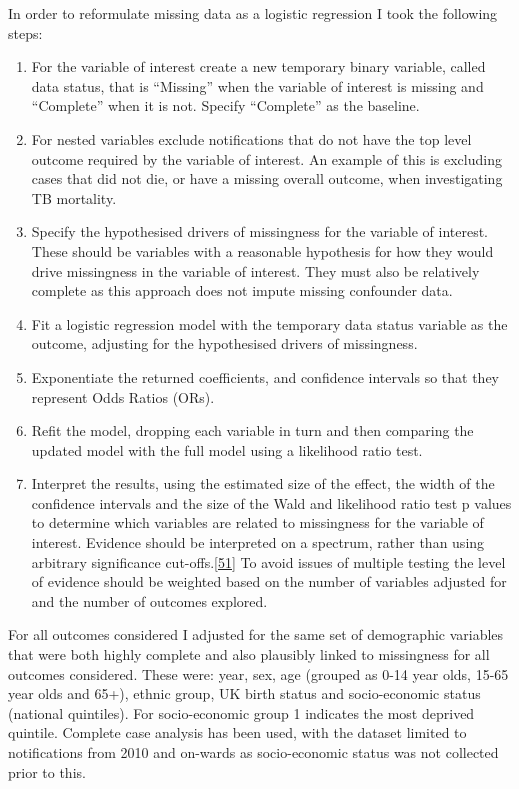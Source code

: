 \documentclass[11pt,twoside]{bristolthesis}
\begin{document}
  In order to reformulate missing data as a logistic regression I took the following steps:
  \begin{enumerate}
  \def\labelenumi{\arabic{enumi}.}
  \item
    For the variable of interest create a new temporary binary variable, called data status, that is ``Missing'' when the variable of interest is missing and ``Complete'' when it is not. Specify ``Complete'' as the baseline.
  \item
    For nested variables exclude notifications that do not have the top level outcome required by the variable of interest. An example of this is excluding cases that did not die, or have a missing overall outcome, when investigating TB mortality.
  \item
    Specify the hypothesised drivers of missingness for the variable of interest. These should be variables with a reasonable hypothesis for how they would drive missingness in the variable of interest. They must also be relatively complete as this approach does not impute missing confounder data.
  \item
    Fit a logistic regression model with the temporary data status variable as the outcome, adjusting for the hypothesised drivers of missingness.
  \item
    Exponentiate the returned coefficients, and confidence intervals so that they represent Odds Ratios (ORs).
  \item
    Refit the model, dropping each variable in turn and then comparing the updated model with the full model using a likelihood ratio test.
  \item
    Interpret the results, using the estimated size of the effect, the width of the confidence intervals and the size of the Wald and likelihood ratio test p values to determine which variables are related to missingness for the variable of interest. Evidence should be interpreted on a spectrum, rather than using arbitrary significance cut-offs.{[}\protect\hyperlink{ref-Sterne2001}{51}{]} To avoid issues of multiple testing the level of evidence should be weighted based on the number of variables adjusted for and the number of outcomes explored.
  \end{enumerate}
  For all outcomes considered I adjusted for the same set of demographic variables that were both highly complete and also plausibly linked to missingness for all outcomes considered. These were: year, sex, age (grouped as 0-14 year olds, 15-65 year olds and 65+), ethnic group, UK birth status and socio-economic status (national quintiles). For socio-economic group 1 indicates the most deprived quintile. Complete case analysis has been used, with the dataset limited to notifications from 2010 and on-wards as socio-economic status was not collected prior to this.
  
\end{document}
